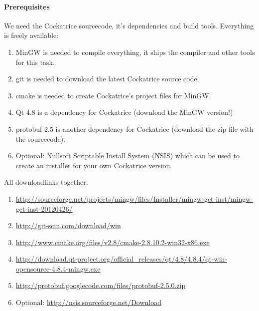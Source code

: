 \documentclass[a4paper]{scrbook}
\begin{document}
\paragraph{Prerequisites}
We need the Cockatrice sourcecode, it's dependencies and build tools. Everything is freely available:
\begin{enumerate}
 \item MinGW is needed to compile everything, it ships the compiler and other tools for this task.
 \item git is needed to download the latest Cockatrice source code.
 \item cmake is needed to create Cockatrice's project files for MinGW.
 \item Qt 4.8 is a dependency for Cockatrice (download the MinGW version!)
 \item protobuf 2.5 is another dependency for Cockatrice (download the zip file with the sourcecode).
 \item Optional: Nullsoft Scriptable Install System (NSIS) which can be used to create an installer for your own Cockatrice version.
\end{enumerate}

All downloadlinks together:
\footnotesize{\begin{enumerate}
 \item \url{http://sourceforge.net/projects/mingw/files/Installer/mingw-get-inst/mingw-get-inst-20120426/}
 \item \url{http://git-scm.com/download/win}
 \item \url{http://www.cmake.org/files/v2.8/cmake-2.8.10.2-win32-x86.exe}
 \item \url{http://download.qt-project.org/official_releases/qt/4.8/4.8.4/qt-win-opensource-4.8.4-mingw.exe}
 \item \url{http://protobuf.googlecode.com/files/protobuf-2.5.0.zip}
 \item Optional: \url{http://nsis.sourceforge.net/Download}
\end{enumerate}}
\end{document}
